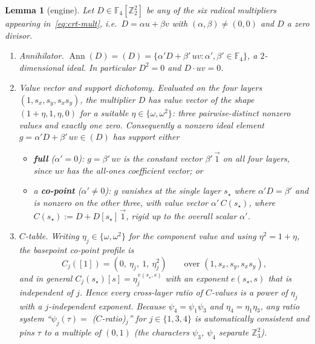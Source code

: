 \documentclass[11pt]{article}
\newcommand{\Z}{\mathbb{Z}}
\newcommand{\F}[1]{\mathbb{F}_{#1}}
\DeclareMathOperator{\Ann}{Ann}
\newcommand{\sx}{s_x}
\newcommand{\sy}{s_y}
\theoremstyle{plain}
\newtheorem{lemma}{Lemma}[section]
\theoremstyle{definition}
\theoremstyle{remark}
\begin{document}
\begin{lemma}[engine]\label{lem:engine}
Let $D\in\F4[\Z_2^2]$ be any of the six radical multipliers appearing
in~\eqref{eq:crt-mult}, i.e.\ $D=\alpha u+\beta v$ with $(\alpha,\beta)\ne(0,0)$
and $D$ a zero divisor.
\begin{enumerate}
\item[\textup{(i)}] \emph{Annihilator.} $\Ann(D)=(D)=\{\alpha' D+\beta'\,uv:
  \alpha',\beta'\in\F4\}$, a $2$-dimensional ideal. In particular $D^2=0$ and
  $D\cdot uv=0$.
\item[\textup{(ii)}] \emph{Value vector and support dichotomy.} Evaluated on the
  four layers $(1,\sx,\sy,\sx\sy)$, the multiplier $D$ has value vector of the
  shape $(1+\eta,1,\eta,0)$ for a suitable $\eta\in\{\omega,\omega^2\}$: three
  pairwise-distinct nonzero values and exactly one zero. Consequently a nonzero
  ideal element $g=\alpha' D+\beta'\,uv\in(D)$ has support either
  \begin{itemize}
    \item \textbf{full} ($\alpha'=0$): $g=\beta'\,uv$ is the constant vector
      $\beta'\,\vec{1}$ on all four layers, since $uv$ has the all-ones
      coefficient vector; or
    \item a \textbf{co-point} ($\alpha'\ne0$): $g$ vanishes at the single layer
      $s_\star$ where $\alpha' D=\beta'$ and is nonzero on the other three, with
      value vector $\alpha'\,C(s_\star)$, where $C(s_\star):=D+D[s_\star]\,\vec{1}$,
      rigid up to the overall scalar $\alpha'$.
  \end{itemize}
\item[\textup{(iii)}] \emph{$C$-table.} Writing $\eta_j\in\{\omega,\omega^2\}$ for
  the component value and using $\eta^2=1+\eta$, the basepoint co-point profile is
  \[
    C_j([1])=(0,\ \eta_j,\ 1,\ \eta_j^2)\qquad\text{over }(1,\sx,\sy,\sx\sy),
  \]
  and in general $C_j(s_\star)[s]=\eta_j^{\,e(s_\star,s)}$ with an exponent
  $e(s_\star,s)$ that is \emph{independent of $j$}. Hence every cross-layer ratio
  of $C$-values is a power of $\eta_j$ with a $j$-independent exponent. Because
  $\psi_4=\psi_1\psi_3$ and $\eta_4=\eta_1\eta_3$, any ratio system
  ``$\psi_j(\tau)=$ ($C$-ratio)$_j$'' for $j\in\{1,3,4\}$ is automatically
  consistent and pins $\tau$ to a multiple of $(0,1)$ (the characters $\psi_3$,
  $\psi_4$ separate $\Z_3^2$).
\end{enumerate}
\end{lemma}
\end{document}

